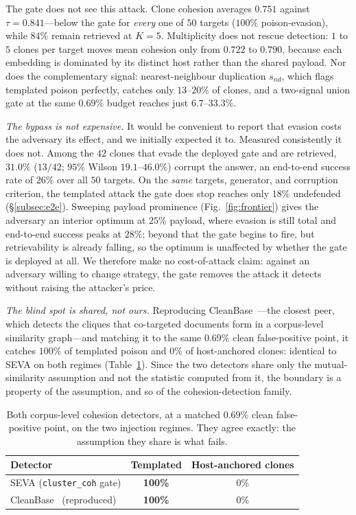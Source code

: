 \documentclass[conference]{IEEEtran}
\begin{document}
The gate does not see this attack. Clone cohesion averages $0.751$ against $\tau=0.841$---below
the gate for \emph{every} one of $50$ targets ($100\%$ poison-evasion), while $84\%$ remain
retrieved at $K=5$. Multiplicity does not rescue detection: $1$ to $5$ clones per target moves
mean cohesion only from $0.722$ to $0.790$, because each embedding is dominated by its distinct
host rather than the shared payload. Nor does the complementary signal: nearest-neighbour
duplication $s_{nd}$, which flags templated poison perfectly, catches only $13$--$20\%$ of
clones, and a two-signal union gate at the same $0.69\%$ budget reaches just $6.7$--$33.3\%$.

\emph{The bypass is not expensive.} It would be convenient to report that evasion costs the
adversary its effect, and we initially expected it to. Measured consistently it does not. Among
the $42$ clones that evade the deployed gate and are retrieved, $31.0\%$ ($13/42$; $95\%$ Wilson
$19.1$--$46.0\%$) corrupt the answer, an end-to-end success rate of $26\%$ over all $50$
targets. On the \emph{same} targets, generator, and corruption criterion, the templated attack
the gate does stop reaches only $18\%$ undefended (\S\ref{subsec:e2e}). Sweeping payload
prominence (Fig.~\ref{fig:frontier}) gives the adversary an interior optimum at $25\%$ payload,
where evasion is still total and end-to-end success peaks at $28\%$; beyond that the gate begins
to fire, but retrievability is already falling, so the optimum is unaffected by whether the gate
is deployed at all. We therefore make no cost-of-attack claim: against an adversary willing to
change strategy, the gate removes the attack it detects without raising the attacker's price.

\emph{The blind spot is shared, not ours.} Reproducing CleanBase~\cite{cleanbase}---the closest
peer, which detects the cliques that co-targeted documents form in a corpus-level similarity
graph---and matching it to the same $0.69\%$ clean false-positive point, it catches $100\%$ of
templated poison and $0\%$ of host-anchored clones: identical to SEVA on both regimes
(Table~\ref{tab:boundary}). Since the two detectors share only the mutual-similarity assumption
and not the statistic computed from it, the boundary is a property of the assumption, and so of
the cohesion-detection family.

\begin{table}[t]
\centering
\caption{Both corpus-level cohesion detectors, at a matched $0.69\%$ clean false-positive point,
on the two injection regimes. They agree exactly: the assumption they share is what fails.}
\label{tab:boundary}
\begin{tabular}{lcc}
\toprule
Detector & Templated & Host-anchored clones \\
\midrule
SEVA (\texttt{cluster\_coh} gate) & \textbf{100\%} & $0\%$ \\
CleanBase~\cite{cleanbase} (reproduced) & \textbf{100\%} & $0\%$ \\
\bottomrule
\end{tabular}
\end{table}
\end{document}
